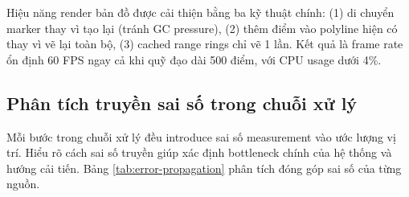 \begin{table}[H]
\centering
{}
\caption{Các lớp dữ liệu trên bản đồ}
\label{tab:map-layers}
\end{table}

Hiệu năng render bản đồ được cải thiện bằng ba kỹ thuật chính: (1) di chuyển marker thay vì tạo lại (tránh GC pressure), (2) thêm điểm vào polyline hiện có thay vì vẽ lại toàn bộ, (3) cached range rings chỉ vẽ 1 lần. Kết quả là frame rate ổn định 60 FPS ngay cả khi quỹ đạo dài 500 điểm, với CPU usage dưới 4\%.

\subsection{Phân tích truyền sai số trong chuỗi xử lý}

\hspace{0.5cm} Mỗi bước trong chuỗi xử lý đều introduce sai số measurement vào ước lượng vị trí. Hiểu rõ cách sai số truyền giúp xác định bottleneck chính của hệ thống và hướng cải tiến. Bảng \ref{tab:error-propagation} phân tích đóng góp sai số của từng nguồn.

